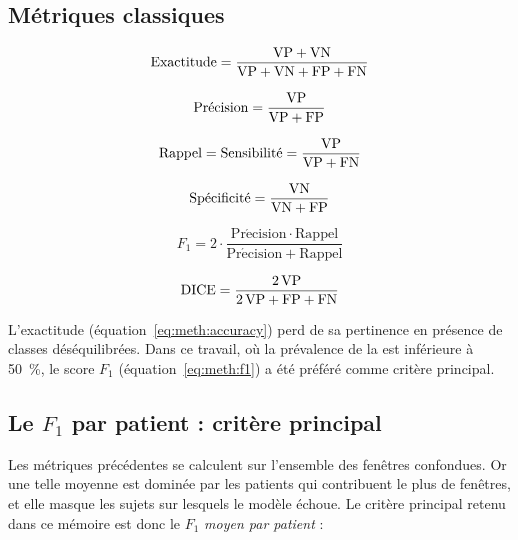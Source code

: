\subsection{Métriques classiques}

\begin{equation}
  \mathrm{Exactitude} = \frac{\mathrm{VP}{} + \mathrm{VN}{}}{\mathrm{VP}{} + \mathrm{VN}{} + \mathrm{FP}{} + \mathrm{FN}{}}
  \label{eq:meth:accuracy}
\end{equation}

\begin{equation}
  \mathrm{Pr\acute{e}cision} = \frac{\mathrm{VP}{}}{\mathrm{VP}{} + \mathrm{FP}{}}
  \label{eq:meth:precision}
\end{equation}

\begin{equation}
  \mathrm{Rappel} = \mathrm{Sensibilit\acute{e}} = \frac{\mathrm{VP}{}}{\mathrm{VP}{} + \mathrm{FN}{}}
  \label{eq:meth:rappel}
\end{equation}

\begin{equation}
  \mathrm{Sp\acute{e}cificit\acute{e}} = \frac{\mathrm{VN}{}}{\mathrm{VN}{} + \mathrm{FP}{}}
  \label{eq:meth:specificite}
\end{equation}

\begin{equation}
  F_1 = 2 \cdot \frac{\mathrm{Pr\acute{e}cision} \cdot \mathrm{Rappel}}{\mathrm{Pr\acute{e}cision} + \mathrm{Rappel}}
  \label{eq:meth:f1}
\end{equation}

\begin{equation}
  \mathrm{DICE} = \frac{2\,\mathrm{VP}{}}{2\,\mathrm{VP}{} + \mathrm{FP}{} + \mathrm{FN}{}}
  \label{eq:meth:dice}
\end{equation}

L'exactitude (équation~\ref{eq:meth:accuracy}) perd de sa pertinence en présence de classes déséquilibrées. Dans ce travail, où la prévalence de la \FA{} est inférieure à 50~\%, le score \(F_1\) (équation~\ref{eq:meth:f1}) a été préféré comme critère principal.

\subsection{\texorpdfstring{Le \(F_1\) par patient}{Le F1 par patient} : critère principal}
\label{sec:meth:f1patient}
Les métriques précédentes se calculent sur l'ensemble des fenêtres confondues. Or une telle moyenne est dominée par les patients qui contribuent le plus de fenêtres, et elle masque les sujets sur lesquels le modèle échoue. Le critère principal retenu dans ce mémoire est donc le \(F_1\) \emph{moyen par patient} :

